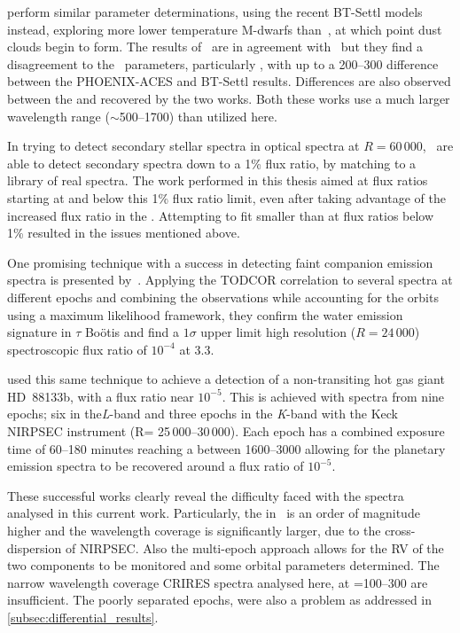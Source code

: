 \citet{rajpurohit_exploring_2018} perform similar parameter determinations, using the recent {BT-Settl} models instead, exploring more lower temperature {M-dwarfs} than~\citet{passegger_carmenes_2018}, at which point dust clouds begin to form.
The results of~\citet{rajpurohit_exploring_2018} are in agreement with~\citep{gaidos_dwarf_2014} but they find a disagreement to the~\citet{passegger_carmenes_2018} parameters, particularly \Teff{}, with up to a 200--300\K{} difference between the {PHOENIX-ACES} and {BT-Settl} results.
Differences are also observed between the \Logg{} and \feh{} recovered by the two works.
Both these works use a much larger wavelength range (\(\sim\)500--1700\nm{}) than utilized here.

In trying to detect secondary stellar spectra in optical spectra at \(R=60\,000\),~\citep{kolbl_detection_2015} are able to detect secondary spectra down to a 1\% flux ratio, by matching to a library of real spectra.
The work performed in this thesis aimed at flux ratios starting at and below this 1\% flux ratio limit, even after taking advantage of the increased flux ratio in the \nir{}. Attempting to fit smaller than at flux ratios below 1\% resulted in the issues mentioned above.

One promising technique with a success in detecting faint companion emission spectra is presented by~\citet{lockwood_nearir_2014}.
Applying the {TODCOR} correlation to several spectra at different epochs and combining the observations while accounting for the orbits using a maximum likelihood framework, they confirm the water emission signature in {\(\tau\) Bo\"{o}tis} and find a \(1\sigma\) upper limit high resolution (\(R=24\,000\)) spectroscopic flux ratio of \(10^{-4}\) at 3.3\um{}.

\citet{piskorz_evidence_2016} used this same technique to achieve a detection of a non-transiting hot gas giant {HD~88133}b, with a flux ratio near \(10^{-5}\).
This is achieved with spectra from nine epochs; six in the\emph{L}-band and three epochs in the \emph{K}-band with the Keck {NIRPSEC} instrument (R= 25\,000--30\,000).
Each epoch has a combined exposure time of 60--180 minutes reaching a \snr{} between 1600--3000 allowing for the planetary emission spectra to be recovered around a flux ratio of \(10^{-5}\).

These successful works clearly reveal the difficulty faced with the spectra analysed in this current work.
Particularly, the \snr{} in~\citet{piskorz_evidence_2016} is an order of magnitude higher and the wavelength coverage is significantly larger, due to the cross-dispersion of {NIRPSEC}.
Also the multi-epoch approach allows for the {RV} of the two components to be monitored and some orbital parameters determined.
The narrow wavelength coverage CRIRES spectra analysed here, at \snr{}=100--300 are insufficient.
The poorly separated epochs, were also a problem as addressed in \cref{subsec:differential_results}.

